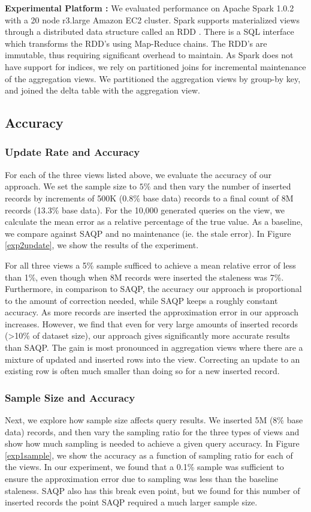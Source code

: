 {\noindent \bf Experimental Platform :}
We evaluated performance on Apache Spark 1.0.2 with a 20 node r3.large Amazon EC2 cluster.
Spark supports materialized views through a distributed data structure called an RDD \cite{zaharia2012resilient}.
There is a SQL interface which transforms the RDD's using Map-Reduce chains.
The RDD's are immutable, thus requiring significant overhead to maintain.
As Spark does not have support for indices, we rely on partitioned joins for incremental maintenance of the aggregation views.
We partitioned the aggregation views by group-by key, and joined the delta table with the aggregation view.

\subsection{Accuracy}

\subsubsection{Update Rate and Accuracy}
For each of the three views listed above, we evaluate the accuracy of our approach.
We set the sample size to $5\%$ and then vary the number of inserted records by increments of 500K (0.8\% base data) records to a final count of 8M records (13.3\% base data).
For the 10,000 generated queries on the view, we calculate the mean error as a relative percentage of the true value.
As a baseline, we compare against SAQP and no maintenance (ie. the stale error).
In Figure \ref{exp2update}, we show the results of the experiment. 

For all three views a 5\% sample sufficed to achieve a mean relative error of less than 1\%, even though when 8M records were inserted the staleness was 7\%.
Furthermore, in comparison to SAQP, the accuracy our approach is proportional to the amount of correction needed, while SAQP keeps a roughly constant accuracy.
As more records are inserted the approximation error in our approach increases.
However, we find that even for very large amounts of inserted records (>10\% of dataset size), our approach gives significantly more accurate results
than SAQP.
The gain is most pronounced in aggregation views where there are a mixture of updated and inserted rows into the view.
Correcting an update to an existing row is often much smaller than doing so for a new inserted record.

\subsubsection{Sample Size and Accuracy} Next, we explore how sample size affects query results.
We inserted 5M (8\% base data) records, and then vary the sampling ratio for the three types of views and show how much sampling is needed to achieve a given query accuracy.
In Figure \ref{exp1sample}, we show the accuracy as a function of sampling ratio for each of the views.
In our experiment, we found that a 0.1\% sample was sufficient to ensure the approximation error due to sampling was less than the baseline staleness.
SAQP also has this break even point, but we found for this number of inserted records the point SAQP required a much larger sample size.

